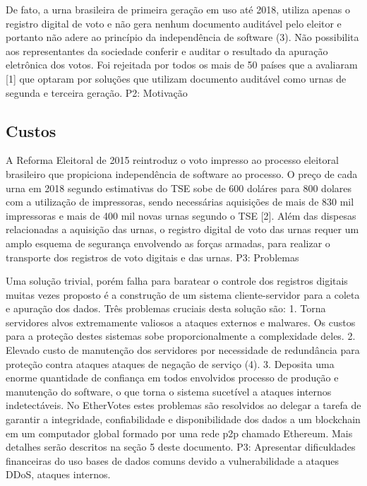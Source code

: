 \documentclass[
	article,			%
	11pt,				%
	oneside,			%
	a4paper,			%
	english,			%
	brazil,				%
	sumario=tradicional
	]{abntex2}
\begin{document}
De fato, a urna brasileira de primeira geração em uso até 2018, utiliza apenas o registro digital de voto e não gera nenhum documento auditável pelo eleitor e portanto não adere ao princípio da independência de software (3). Não possibilita aos representantes da sociedade conferir e auditar o resultado da apuração eletrônica dos votos. Foi rejeitada por todos os mais de 50 países que a avaliaram [1] que optaram por soluções que utilizam documento auditável como urnas de segunda e terceira geração. {P2: Motivação} 

\subsection{Custos}

A Reforma Eleitoral de 2015 reintroduz o voto impresso ao processo eleitoral brasileiro que propiciona independência de software ao processo. O preço de cada urna em 2018 segundo estimativas do TSE sobe de 600 doláres para 800 dolares com a utilização de impressoras, sendo necessárias aquisições de mais de 830 mil impressoras e mais de 400 mil novas urnas segundo o TSE [2].  Além das dispesas relacionadas a aquisição das urnas, o registro digital de voto das urnas requer um amplo esquema de segurança envolvendo as forças armadas, para realizar o transporte dos registros de voto digitais e das urnas. {P3: Problemas}

Uma solução trivial, porém falha para baratear o controle dos registros digitais muitas vezes proposto é a construção de um sistema cliente-servidor para a coleta e apuração dos dados. Três problemas cruciais desta solução são: 
1. Torna servidores alvos extremamente valiosos a ataques externos e malwares. Os custos para a proteção destes sistemas sobe proporcionalmente a complexidade deles.
2. Elevado custo de manutenção dos servidores por necessidade de redundância para proteção contra ataques ataques de negação de serviço (4).
3. Deposita uma enorme quantidade de confiança em todos envolvidos processo de produção e manutenção do software, o que torna o sistema sucetível a ataques internos indetectáveis. 
No EtherVotes estes problemas são resolvidos ao delegar a tarefa de garantir a integridade, confiabilidade e disponibilidade dos dados a um blockchain em um computador global formado por uma rede p2p chamado Ethereum. Mais detalhes serão descritos na seção 5 deste documento.  {P3: Apresentar dificuldades financeiras do uso bases de dados comuns devido a vulnerabilidade a ataques DDoS, ataques internos.}
\end{document}
